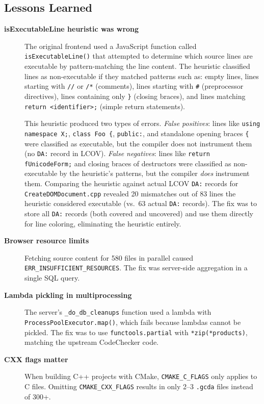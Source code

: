 \subsection{Lessons Learned}

\begin{description}
    \item[\textbf{isExecutableLine heuristic was wrong}] The original frontend used a JavaScript function called \texttt{isExecutableLine()} that attempted to determine which source lines are executable by pattern-matching the line content. The heuristic classified lines as non-executable if they matched patterns such as: empty lines, lines starting with \texttt{//} or \texttt{/*} (comments), lines starting with \texttt{\#} (preprocessor directives), lines containing only \texttt{\}} (closing braces), and lines matching \texttt{return <identifier>;} (simple return statements).

    This heuristic produced two types of errors. \emph{False positives}: lines like \texttt{using namespace X;}, \texttt{class Foo \{}, \texttt{public:}, and standalone opening braces \texttt{\{} were classified as executable, but the compiler does not instrument them (no \texttt{DA:} record in LCOV). \emph{False negatives}: lines like \texttt{return fUnicodeForm;} and closing braces of destructors were classified as non-executable by the heuristic's patterns, but the compiler \emph{does} instrument them. Comparing the heuristic against actual LCOV \texttt{DA:} records for \texttt{CreateDOMDocument.cpp} revealed 20 mismatches out of 83 lines the heuristic considered executable (vs.\ 63 actual \texttt{DA:} records). The fix was to store all \texttt{DA:} records (both covered and uncovered) and use them directly for line coloring, eliminating the heuristic entirely.

    \item[\textbf{Browser resource limits}] Fetching source content for 580 files in parallel caused \texttt{ERR\_INSUFFICIENT\_RESOURCES}. The fix was server-side aggregation in a single SQL query.

    \item[\textbf{Lambda pickling in multiprocessing}] The server's \texttt{\_do\_db\_cleanups} function used a lambda with \texttt{ProcessPoolExecutor.map()}, which fails because lambdas cannot be pickled. The fix was to use \texttt{functools.partial} with \texttt{*zip(*products)}, matching the upstream CodeChecker code.

    \item[\textbf{CXX flags matter}] When building C++ projects with CMake, \texttt{CMAKE\_C\_FLAGS} only applies to C files. Omitting \texttt{CMAKE\_CXX\_FLAGS} results in only 2--3 \texttt{.gcda} files instead of 300+.
\end{description}
